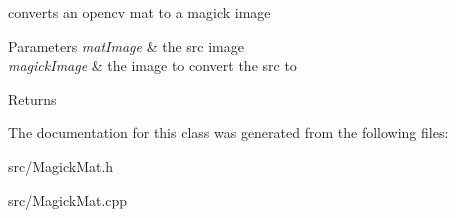 converts an opencv mat to a magick image 


\begin{DoxyParams}{Parameters}
{\em matImage} & the src image \\
\hline
{\em magickImage} & the image to convert the src to \\
\hline
\end{DoxyParams}
\begin{DoxyReturn}{Returns}

\end{DoxyReturn}


The documentation for this class was generated from the following files:\begin{DoxyCompactItemize}
\item 
src/MagickMat.h\item 
src/MagickMat.cpp\end{DoxyCompactItemize}
